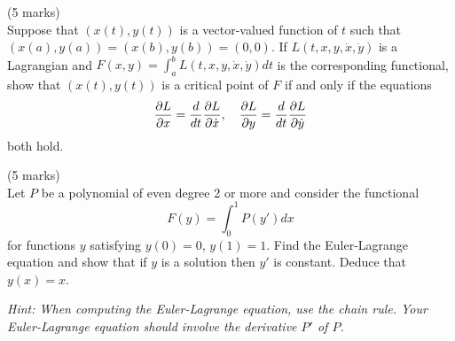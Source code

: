 \documentclass[12pt]{article}
\begin{document}
\newpage
\fi


\bigskip
\begin{question}(5 marks)\\
Suppose that $(x(t),y(t))$ is a vector-valued function of $t$ such that $(x(a),y(a))=(x(b),y(b))=(0,0)$. If $L(t,x,y,\dot{x},\dot{y})$ is a Lagrangian and $F(x,y)=\int_a^bL(t,x,y,\dot{x},\dot{y})dt$ is the corresponding functional, show that $(x(t),y(t))$ is a critical point of $F$ if and only if the equations
\[\dfrac{\partial L}{\partial x}=\dfrac{d }{d t}\dfrac{\partial L}{\partial \dot{x}},\quad\dfrac{\partial L}{\partial y}=\dfrac{d }{d t}\dfrac{\partial L}{\partial \dot{y}}\]
both hold.
\end{question}

\iffalse
\begin{answer}
If we make a variation $x(t)\mapsto x(t)+\delta(t)$, $y(t)\mapsto y(t)+\epsilon(t)$ with $\delta(a)=\delta(b)=\epsilon(a)=\epsilon(b)=0$ then, to first order, the variation in $L$ is
\[L(t,x+\delta,y+\epsilon,\dot{x}+\dot{\delta},\dot{y}+\dot{\epsilon})-L(t,x,y,\dot{x},\dot{y})=\pd{L}{x}\delta+\pd{L}{y}\epsilon+\pd{L}{\dot{x}}\dot{\delta}+\pd{L}{\dot{y}}\dot{\epsilon}\]
The corresponding variation in $F(x,y)$ is\mks{2}
\[d_{(x,y)}F(\delta,\epsilon)=\int_a^b\left(\pd{L}{x}\delta+\pd{L}{y}\epsilon+\pd{L}{\dot{x}}\dot{\delta}+\pd{L}{\dot{y}}\dot{\epsilon}\right)dt\]
Integrating by parts this gives\mks{1}
\[\int_a^b\left(\pd{L}{x}-\dd{}{t}\pd{L}{x}\right)\delta dt+\int_a^b\left(\pd{L}{y}-\dd{}{t}\pd{L}{y}\right)\epsilon dt+\left[\pd{L}{\dot{x}}\delta+\pd{L}{\dot{y}}\epsilon\right]_a^b\]
and the boundary terms vanish because $\delta$ and $\epsilon$ both vanish at $a$ and $b$. Setting $\epsilon=0$ we see that $\displaystyle\int_a^b\left(\pd{L}{x}-\dd{}{t}\pd{L}{\dot{x}}\right)\delta dt=0$ for all $\delta$ (so the integrand must vanish) and setting $\delta=0$ we see, likewise, that $\pd{L}{y}-\dd{}{t}\pd{L}{\dot{y}}=0$.\mks{2}
\end{answer}
\newpage
\fi
\bigskip


\begin{question}(5 marks)\\
Let $P$ be a polynomial of even degree 2 or more and consider the functional
\[F(y)=\int_0^1P(y')dx\]
for functions $y$ satisfying $y(0)=0$, $y(1)=1$. Find the Euler-Lagrange equation and show that if $y$ is a solution then $y'$ is constant. Deduce that $y(x)=x$.

{\em Hint: When computing the Euler-Lagrange equation, use the chain rule. Your Euler-Lagrange equation should involve the derivative $P'$ of $P$.}
\end{question}
\end{document}
